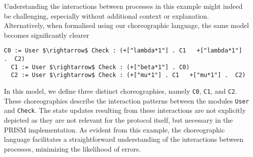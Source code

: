 Understanding the interactions between processes in this example might
indeed be challenging, especially without additional context or
explanation.  Alternatively, when formalised using our choreographic
language, the same model becomes significantly clearer 
\begin{lstlisting}[style=chor-color,% caption={Example of Listing \ref{example1} in our choreographic language},captionpos=b,
  frame=none, label={example2}]
  C0 := User $\rightarrow$ Check : (+["lambda*1"] . C1	 +["lambda*1"]  .  C2)
  C1 := User $\rightarrow$ Check : (+["beta*1"] . C0)  
  C2 := User $\rightarrow$ Check : (+["mu*1"] . C1   +["mu*1"] .  C2)
\end{lstlisting}
In this model, we define three distinct choreographies, namely
\texttt{C0}, \texttt{C1}, and \texttt{C2}. These choreographies
describe the interaction patterns between the modules \texttt{User}
and \texttt{Check}. The state updates resulting from these
interactions are not explicitly depicted as they are not relevant for
the protocol itself, but necessary in the PRISM implementation.
%
As evident from this example, the choreographic language facilitates a
straightforward understanding of the interactions between processes,
minimizing the likelihood of errors.



